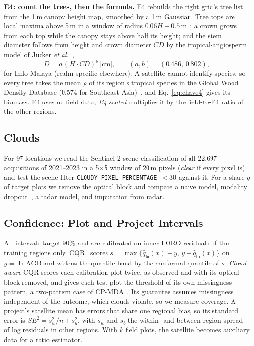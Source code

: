 \documentclass[conference,a4paper]{IEEEtran}
\begin{document}
\textbf{E4: count the trees, then the formula.} E4 rebuilds the right grid's tree list from the 1\,m canopy height map, smoothed by a 1\,m Gaussian. Tree tops are local maxima above 5\,m in a window of radius $0.06H+0.5$\,m~\cite{popescu2004seeing}; a crown grows from each top while the canopy stays above half its height; and the stem diameter follows from height and crown diameter $CD$ by the tropical-angiosperm model of Jucker \textit{et al.}~\cite{jucker2017allometric},
\begin{equation}
D=a\,(H\cdot CD)^{b}\ \text{[cm]},\qquad (a,b)=(0.486,\,0.802),
\label{eq:jucker}
\end{equation}
for Indo-Malaya (realm-specific elsewhere). A satellite cannot identify species, so every tree takes the mean $\rho$ of its region's tropical species in the Global Wood Density Database (0.574 for Southeast Asia)~\cite{rejou2017biomass}, and Eq.~\ref{eq:chave4} gives its biomass. E4 uses no field data; \emph{E4 scaled} multiplies it by the field-to-E4 ratio of the other regions.

\subsection{Clouds}
For 97 locations we read the Sentinel-2 scene classification of all 22{,}697 acquisitions of 2021--2023 in a 5$\times$5 window of 20\,m pixels (\emph{clear} if every pixel is) and test the scene filter \texttt{CLOUDY\_PIXEL\_PERCENTAGE}~$<30$ against it. For a share $q$ of target plots we remove the optical block and compare a naive model, modality dropout~\cite{neverova2016moddrop}, a radar model, and imputation from radar.

\subsection{Confidence: Plot and Project Intervals}
All intervals target 90\% and are calibrated on inner LORO residuals of the training regions only. CQR~\cite{romano2019cqr} scores $s=\max\{\hat q_{\mathrm{lo}}(x)-y,\,y-\hat q_{\mathrm{hi}}(x)\}$ on $y=\ln\mathrm{AGB}$ and widens the quantile band by the conformal quantile of $s$. \emph{Cloud-aware} CQR scores each calibration plot twice, as observed and with its optical block removed, and gives each test plot the threshold of its own missingness pattern, a two-pattern case of CP-MDA~\cite{zaffran2023conformal}. Its guarantee assumes missingness independent of the outcome, which clouds violate, so we measure coverage. A project's satellite mean has errors that share one regional bias, so its standard error is $SE^2=s_w^2/n+s_b^2$, with $s_w$ and $s_b$ the within- and between-region spread of log residuals in other regions. With $k$ field plots, the satellite becomes auxiliary data for a ratio estimator.
\end{document}

